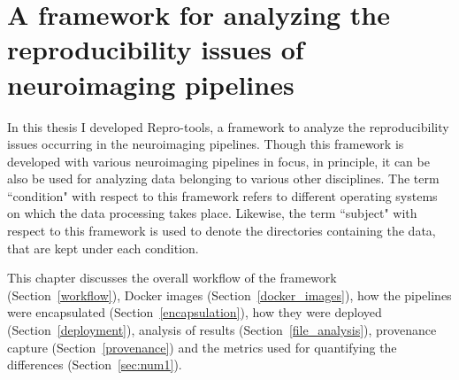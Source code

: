 \chapter{A framework for analyzing the reproducibility issues of neuroimaging pipelines}\label{framework}
In this thesis I developed Repro-tools, a framework to analyze the 
reproducibility issues occurring in the neuroimaging pipelines. Though 
this framework is developed with various neuroimaging pipelines in 
focus, in principle, it can be also be used for analyzing data 
belonging to various other disciplines. The term ``condition" with 
respect to this framework refers to different operating systems on 
which the data processing takes place. Likewise, the term ``subject" 
with respect to this framework is used to denote the directories 
containing the data, that are kept under each condition. 


This chapter discusses the overall workflow of the framework (Section~\ref{workflow}), Docker images (Section~\ref{docker_images}), how the pipelines were encapsulated (Section~\ref{encapsulation}), how they were deployed (Section~\ref{deployment}), analysis of results (Section~\ref{file_analysis}), provenance capture (Section~\ref{provenance}) and the metrics used for quantifying the differences (Section~\ref{sec:num1}).




